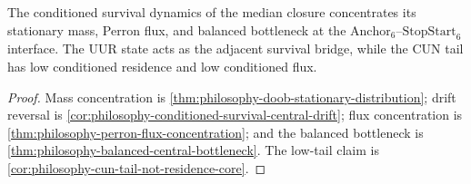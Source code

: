 \begin{theorem}
\label{thm:philosophy-doob-conditioned-median-closure-dynamics}
The conditioned survival dynamics of the median closure concentrates its
stationary mass, Perron flux, and balanced bottleneck at the
$\mathrm{Anchor}_{6}$--$\mathrm{StopStart}_{6}$ interface. The
$\mathrm{UUR}$ state acts as the adjacent survival bridge, while the CUN
tail has low conditioned residence and low conditioned flux.
\end{theorem}
\begin{proof}
Mass concentration is
\autoref{thm:philosophy-doob-stationary-distribution}; drift reversal is
\autoref{cor:philosophy-conditioned-survival-central-drift}; flux
concentration is \autoref{thm:philosophy-perron-flux-concentration};
and the balanced bottleneck is
\autoref{thm:philosophy-balanced-central-bottleneck}. The low-tail
claim is \autoref{cor:philosophy-cun-tail-not-residence-core}.
\end{proof}
